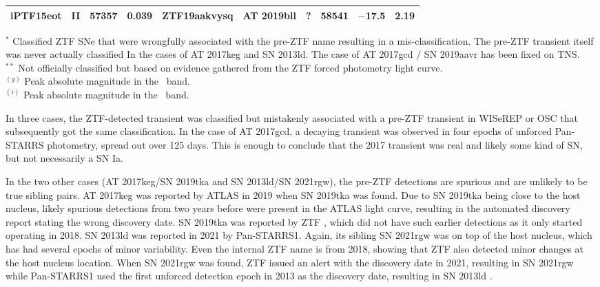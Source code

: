 \documentclass[a4paper,oneside,12pt, class=Latex/Classes/PhDthesisPSnPDF, crop=false]{standalone}
\begin{document}
\begin{table}
{\begin{tabular}{cccc|cccccc}
        iPTF15eot & II & 57357 & 0.039 & ZTF19aakvysq & AT 2019bll & ? & 58541 & $-$17.5 & 2.19 \\
        \hline
    \end{tabular}
    }
    \begin{flushleft}
        $^*$ Classified ZTF SNe that were wrongfully associated with the pre-ZTF name resulting in a mis-classification. The pre-ZTF transient itself was never actually classified In the cases of AT 2017keg and SN 2013ld. The case of AT 2017gcd / SN 2019aavr has been fixed on TNS.\\
        $^{**}$ Not officially classified but based on evidence gathered from the ZTF forced photometry light curve.\\
        $^{(g)}$ Peak absolute magnitude in the \ztfg\ band.\\
        $^{(i)}$ Peak absolute magnitude in the \ztfi\ band.\\
    \end{flushleft}
    \label{sibling_table}
\end{table}

In three cases, the ZTF-detected transient was classified but mistakenly associated with a pre-ZTF transient in WISeREP or OSC that subsequently got the same classification. In the case of AT 2017gcd, a decaying transient was observed in four epochs of unforced Pan-STARRS photometry, spread out over 125 days. This is enough to conclude that the 2017 transient was real and likely some kind of SN, but not necessarily a SN Ia.

In the two other cases (AT 2017keg/SN 2019tka and SN 2013ld/SN 2021rgw), the pre-ZTF detections are spurious and are unlikely to be true sibling pairs. AT 2017keg was reported by ATLAS in 2019 \citep{2017keg_disc} when SN 2019tka was found. Due to SN 2019tka being close to the host nucleus, likely spurious detections from two years before were present in the ATLAS light curve, resulting in the automated discovery report stating the wrong discovery date. SN 2019tka was reported by ZTF \citep{2019tka_disc}, which did not have such earlier detections as it only started operating in 2018. SN 2013ld was reported in 2021 by Pan-STARRS1. Again, its sibling SN 2021rgw was on top of the host nucleus, which has had several epochs of minor variability. Even the internal ZTF name is from 2018, showing that ZTF also detected minor changes at the host nucleus location. When SN 2021rgw was found, ZTF issued an alert with the discovery date in 2021, resulting in SN 2021rgw \citep{2021rgw_disc} while Pan-STARRS1 used the first unforced detection epoch in 2013 as the discovery date, resulting in SN 2013ld \citep{2013ld_disc}.
\end{document}
